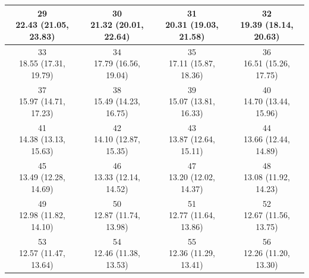 \begin{table}[htbp]
\begin{tabular}{cccc}
\hline
\shortstack[c]{29\\22.43 (21.05, 23.83)} & \shortstack[c]{30\\21.32 (20.01, 22.64)} & \shortstack[c]{31\\20.31 (19.03, 21.58)} & \shortstack[c]{32\\19.39 (18.14, 20.63)} \\
\hline
\shortstack[c]{33\\18.55 (17.31, 19.79)} & \shortstack[c]{34\\17.79 (16.56, 19.04)} & \shortstack[c]{35\\17.11 (15.87, 18.36)} & \shortstack[c]{36\\16.51 (15.26, 17.75)} \\
\hline
\shortstack[c]{37\\15.97 (14.71, 17.23)} & \shortstack[c]{38\\15.49 (14.23, 16.75)} & \shortstack[c]{39\\15.07 (13.81, 16.33)} & \shortstack[c]{40\\14.70 (13.44, 15.96)} \\
\hline
\shortstack[c]{41\\14.38 (13.13, 15.63)} & \shortstack[c]{42\\14.10 (12.87, 15.35)} & \shortstack[c]{43\\13.87 (12.64, 15.11)} & \shortstack[c]{44\\13.66 (12.44, 14.89)} \\
\hline
\shortstack[c]{45\\13.49 (12.28, 14.69)} & \shortstack[c]{46\\13.33 (12.14, 14.52)} & \shortstack[c]{47\\13.20 (12.02, 14.37)} & \shortstack[c]{48\\13.08 (11.92, 14.23)} \\
\hline
\shortstack[c]{49\\12.98 (11.82, 14.10)} & \shortstack[c]{50\\12.87 (11.74, 13.98)} & \shortstack[c]{51\\12.77 (11.64, 13.86)} & \shortstack[c]{52\\12.67 (11.56, 13.75)} \\
\hline
\shortstack[c]{53\\12.57 (11.47, 13.64)} & \shortstack[c]{54\\12.46 (11.38, 13.53)} & \shortstack[c]{55\\12.36 (11.29, 13.41)} & \shortstack[c]{56\\12.26 (11.20, 13.30)} \\

\end{tabular}
\end{table}

